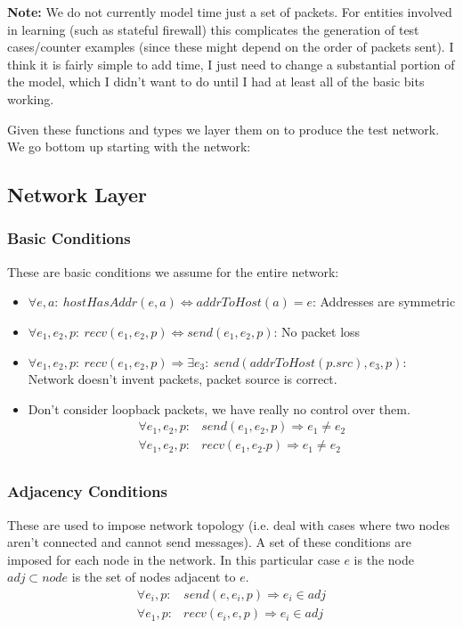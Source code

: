 \textbf{Note:} We do not currently model time just a set of packets. For entities involved in learning (such as stateful
firewall) this complicates the generation of test cases/counter examples (since these might depend on the order of
packets sent). I think it is fairly simple to add time, I just need to change a substantial portion of the model, which
I didn't want to do until I had at least all of the basic bits working.

Given these functions and types we layer them on to produce the test network. We go bottom up starting with the network:

\subsection{Network Layer}
\subsubsection{Basic Conditions}
These are basic conditions we assume for the entire network:
\begin{itemize}
\item $\forall e, a:\ hostHasAddr(e, a)\iff addrToHost(a) = e$: Addresses are symmetric
\item $\forall e_1, e_2, p:\ recv(e_1, e_2, p) \iff send(e_1, e_2, p)$: No packet loss
\item $\forall e_1, e_2, p:\ recv(e_1, e_2, p) \Rightarrow \exists e_3:\ send(addrToHost(p.src), e_3, p)$: Network doesn't
invent packets, packet source is correct.
\item Don't consider loopback packets, we have really no control over them.
\begin{align*}
\forall e_1, e_2, p:& send(e_1, e_2, p) \Rightarrow e_1 \neq e_2\\
\forall e_1, e_2, p:& recv(e_1, e_2. p) \Rightarrow e_1 \neq e_2\\
\end{align*}
\end{itemize}

\subsubsection{Adjacency Conditions}
These are used to impose network topology (i.e. deal with cases where two nodes aren't connected and cannot send
messages). A set of these conditions are imposed for each node in the network.
In this particular case $e$ is the node $adj \subset node$ is the set of nodes adjacent to $e$.
\begin{align*}
\forall e_i, p:& send(e, e_i, p) \Rightarrow e_i \in adj\\
\forall e_1, p:& recv(e_i, e, p) \Rightarrow e_i \in adj
\end{align*}

